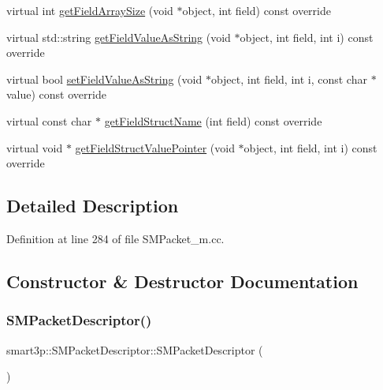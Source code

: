 \begin{DoxyCompactItemize}
\item 
virtual int \hyperlink{classsmart3p_1_1SMPacketDescriptor_a4744e310a7b7003570a5bbd8d801fcad}{get\+Field\+Array\+Size} (void $\ast$object, int field) const override
\item 
virtual std\+::string \hyperlink{classsmart3p_1_1SMPacketDescriptor_acc1d4df999c0f9309872fe08d15393b3}{get\+Field\+Value\+As\+String} (void $\ast$object, int field, int i) const override
\item 
virtual bool \hyperlink{classsmart3p_1_1SMPacketDescriptor_a4cdbc988a0825861aba13a2ceb2db877}{set\+Field\+Value\+As\+String} (void $\ast$object, int field, int i, const char $\ast$value) const override
\item 
virtual const char $\ast$ \hyperlink{classsmart3p_1_1SMPacketDescriptor_a0ddd4481bed0f09279cc169b0315b3d3}{get\+Field\+Struct\+Name} (int field) const override
\item 
virtual void $\ast$ \hyperlink{classsmart3p_1_1SMPacketDescriptor_ac0da23c999b93f87a05b6f0009a716d6}{get\+Field\+Struct\+Value\+Pointer} (void $\ast$object, int field, int i) const override
\end{DoxyCompactItemize}


\subsection{Detailed Description}


Definition at line 284 of file S\+M\+Packet\+\_\+m.\+cc.



\subsection{Constructor \& Destructor Documentation}
\mbox{\label{classsmart3p_1_1SMPacketDescriptor_ae9d949f5e29ab9f05d4cb6274dfa3200}} 
\subsubsection{\texorpdfstring{S\+M\+Packet\+Descriptor()}{SMPacketDescriptor()}}
{\footnotesize\ttfamily smart3p\+::\+S\+M\+Packet\+Descriptor\+::\+S\+M\+Packet\+Descriptor (\begin{DoxyParamCaption}{ }\end{DoxyParamCaption})}




